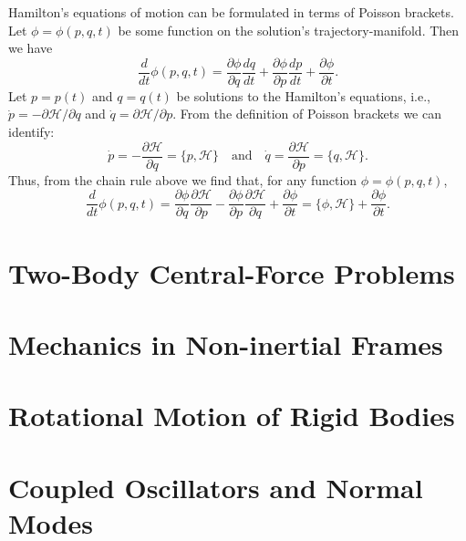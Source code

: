 \documentclass{book}
\theoremstyle{definition}
\newcommand{\p}{\partial}
\newcommand{\ham}{\mathcal{H}}
\newcommand{\f}[2]{\frac{#1}{#2}}
\begin{document}
Hamilton's equations of motion can be formulated in terms of Poisson brackets. Let $\phi = \phi(p,q,t)$ be some function on the solution's trajectory-manifold. Then we have
\begin{equation*}
\f{d}{dt}\phi(p,q,t) = \f{\p \phi}{\p q} \f{d q}{dt} + \f{\p \phi }{\p p} \f{d p}{dt} + \f{\p \phi}{\p t}.
\end{equation*}
Let $p = p(t)$ and $q = q(t)$ be solutions to the Hamilton's equations, i.e., $\dot{p} = -\p \ham / \p q$ and $\dot{q} = \p \ham  / \p p$. From the definition of Poisson brackets we can identify:
\begin{equation*}
\dot{p} = -\f{\p \ham}{\p q} = \{ p,\ham \} \quad \text{and} \quad \dot{q} = \f{\p \ham}{\p p} = \{ q,\ham \}.
\end{equation*}
Thus, from the chain rule above we find that, for any function $\phi = \phi(p,q,t)$,
\begin{equation*}
\f{d}{dt}\phi(p,q,t) = \f{\p \phi}{\p q} \f{\p \ham}{\p p} - \f{\p \phi}{\p p}\f{\p \ham}{\p q} + \f{\p \phi}{\p t} = \{ \phi,\ham \} + \f{\p \phi}{\p t}.
\end{equation*}


\section{Two-Body Central-Force Problems}




\section{Mechanics in Non-inertial Frames}



\section{Rotational Motion of Rigid Bodies}



\section{Coupled Oscillators and Normal Modes}
\end{document}
